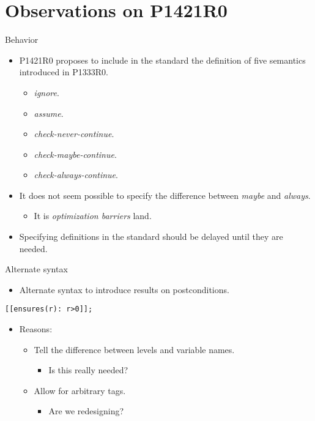 \section{Observations on P1421R0}

\begin{frame}[t]{Behavior}
\begin{itemize}
  \item P1421R0 proposes to include in the standard the definition of
        five semantics introduced in P1333R0.
    \begin{itemize}
      \item \emph{ignore}.
      \item \emph{assume}.
      \item \emph{check-never-continue}.
      \item \emph{check-maybe-continue}.
      \item \emph{check-always-continue}.
    \end{itemize}
  \vfill
  \item It does not seem possible to specify the difference between 
        \emph{maybe} and \emph{always}.
    \begin{itemize}
      \item It is \emph{optimization barriers} land.
    \end{itemize}
  \vfill
  \item Specifying definitions in the standard should be delayed until they are needed.
\end{itemize}
\end{frame}

\begin{frame}[t,fragile]{Alternate syntax}
\begin{itemize}
  \item Alternate syntax to introduce results on postconditions.
\end{itemize}
\begin{lstlisting}
[[ensures(r): r>0]];
\end{lstlisting}
\begin{itemize}
  \item Reasons:
    \begin{itemize}
      \item Tell the difference between levels and variable names.
        \begin{itemize}
          \item Is this really needed?
        \end{itemize}
      \item Allow for arbitrary tags.
        \begin{itemize}
          \item Are we redesigning?
        \end{itemize}
    \end{itemize}
\end{itemize}
\end{frame}
